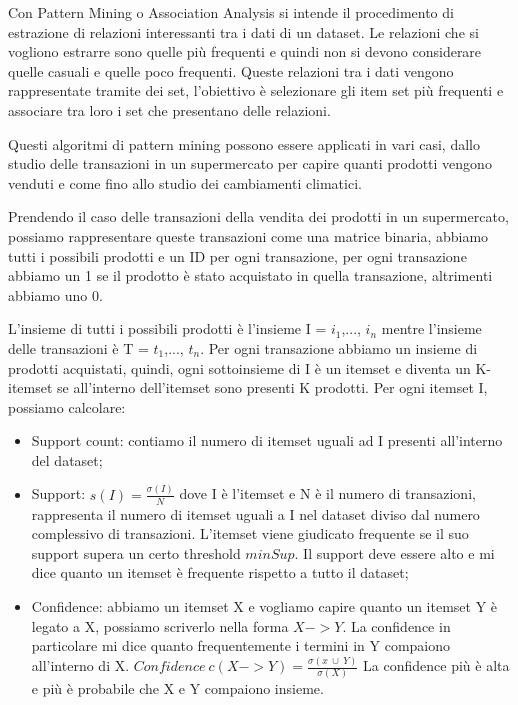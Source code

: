 \documentclass[14pt]{extreport}
\begin{document}
Con Pattern Mining o Association Analysis si intende il procedimento di estrazione di relazioni interessanti tra i dati di un dataset.
Le relazioni che si vogliono estrarre sono quelle più frequenti e quindi non si devono considerare quelle casuali e quelle poco frequenti.
Queste relazioni tra i dati vengono rappresentate tramite dei set, l'obiettivo è selezionare gli item set più frequenti e associare tra loro i set che presentano delle relazioni.

Questi algoritmi di pattern mining possono essere applicati in vari casi, dallo studio delle transazioni in un supermercato per capire quanti prodotti vengono venduti e come fino allo studio dei cambiamenti climatici.

Prendendo il caso delle transazioni della vendita dei prodotti in un supermercato, possiamo rappresentare queste transazioni come una matrice binaria, abbiamo tutti i possibili prodotti e un ID per ogni transazione, per ogni transazione abbiamo un 1 se il prodotto è stato acquistato in quella transazione, altrimenti abbiamo uno 0.

L'insieme di tutti i possibili prodotti è l'insieme I = {$i_1$,..., $i_n$} mentre l'insieme delle transazioni è T = {$t_1$,..., $t_n$}.
Per ogni transazione abbiamo un insieme di prodotti acquistati, quindi, ogni sottoinsieme di I è un itemset e diventa un K-itemset se all'interno dell'itemset sono presenti K prodotti.
Per ogni itemset I, possiamo calcolare:
\begin{itemize}
    \item Support count: contiamo il numero di itemset uguali ad I presenti all'interno del dataset;
    \item Support: $s(I) = \frac{\sigma{(I)}}{N}$ dove I è l'itemset e N è il numero di transazioni, rappresenta il numero di itemset uguali a I nel dataset diviso dal numero complessivo di transazioni. L'itemset viene giudicato frequente se il suo support supera un certo threshold $minSup$.
    Il support deve essere alto e mi dice quanto un itemset è frequente rispetto a tutto il dataset;
    \item Confidence: abbiamo un itemset X e vogliamo capire quanto un itemset Y è legato a X, possiamo scriverlo nella forma $X -> Y$.
    La confidence in particolare mi dice quanto frequentemente i termini in Y compaiono all'interno di X.
    \newline
    $Confidence \ c(X->Y) = \frac{\sigma{(x\ \cup \ Y)}}{\sigma{(X)}}$
    La confidence più è alta e più è probabile che X e Y compaiono insieme.
\end{itemize}
\end{document}
